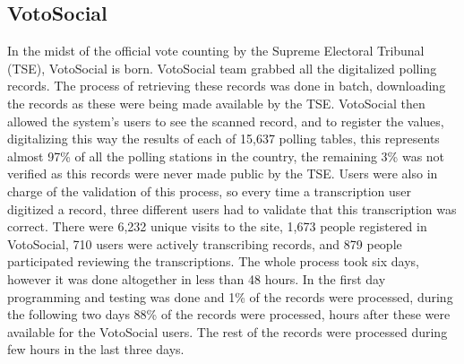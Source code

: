 \documentclass[a4paper,10pt]{article}
\begin{document}
\subsection{VotoSocial}

In the midst of the official vote counting by the Supreme Electoral Tribunal (TSE), VotoSocial is born. VotoSocial team grabbed all the digitalized polling records. The process of retrieving these records was done in batch, downloading the records as these were being made available by the TSE. VotoSocial then allowed the system's users to see the scanned record, and to register the values, digitalizing this way the results of each of 15,637 polling tables, this represents almost 97\% of all the polling stations in the country, the remaining 3\% was not verified as this records were never made public by the TSE. Users were also in charge of the validation of this process, so every time a transcription user digitized a record, three different users had to validate that this transcription was correct. There were 6,232 unique visits to the site, 1,673 people registered in VotoSocial, 710 users were actively transcribing records, and 879 people participated reviewing the transcriptions. The whole process took six days, however it was done altogether in less than 48 hours. In the first day programming and testing was done and 1\% of the records were processed, during the following two days 88\% of the records were processed, hours after these were available for the VotoSocial users. The rest of the records were processed during few hours in the last three days.
\end{document}
